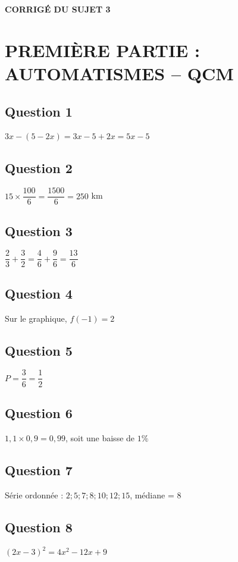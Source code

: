 \documentclass[a4paper,12pt]{article}
\begin{document}
\begin{center}\Large\textbf{CORRIGÉ DU SUJET 3}\end{center}

\section*{PREMIÈRE PARTIE : AUTOMATISMES -- QCM}

\subsection*{Question 1}
$3x - (5 - 2x) = 3x - 5 + 2x = 5x - 5$ \hfill {}

\subsection*{Question 2}
$15 \times \dfrac{100}{6} = \dfrac{1500}{6} = 250$ km \hfill {}

\subsection*{Question 3}
$\dfrac{2}{3} + \dfrac{3}{2} = \dfrac{4}{6} + \dfrac{9}{6} = \dfrac{13}{6}$ \hfill {}

\subsection*{Question 4}
Sur le graphique,  $f(-1) = 2$ \hfill {}

\subsection*{Question 5}
$P = \dfrac{3}{6} = \dfrac{1}{2}$ \hfill {}

\subsection*{Question 6}
$1,1 \times 0,9 = 0,99$, soit une baisse de $1\%$ \hfill {}

\subsection*{Question 7}
Série ordonnée : $2;5;7;8;10;12;15$, médiane = $8$ \hfill {}

\subsection*{Question 8}
$(2x-3)^2 = 4x^2 - 12x + 9$ \hfill {}
\end{document}
